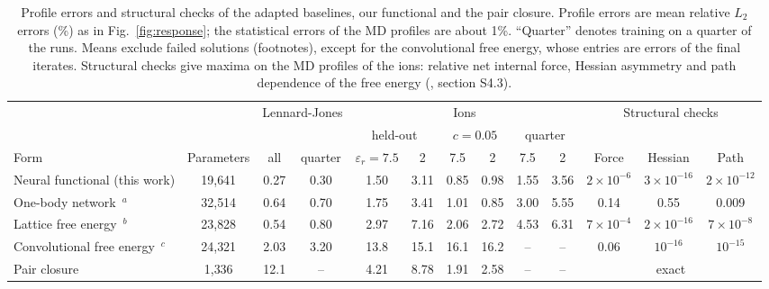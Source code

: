 \begin{table}[tb]
\centering
\caption{Profile errors and structural checks of the adapted baselines, our functional and the pair closure. Profile errors are mean relative $L_2$ errors (\%) as in Fig.~\ref{fig:response}; the statistical errors of the MD profiles are about 1\%. ``Quarter'' denotes training on a quarter of the runs. Means exclude failed solutions (footnotes), except for the convolutional free energy, whose entries are errors of the final iterates. Structural checks give maxima on the MD profiles of the ions: relative net internal force, Hessian asymmetry and path dependence of the free energy (\siref, section S4.3).}
\label{tab:compare}
\small
\setlength{\tabcolsep}{3pt}\begin{tabular}{lcccccccccccc}
 & & \multicolumn{2}{c}{Lennard-Jones} & \multicolumn{6}{c}{Ions} & \multicolumn{3}{c}{Structural checks}\\
\cmidrule(lr){3-4}\cmidrule(lr){5-10}\cmidrule(lr){11-13}
 & & & & \multicolumn{2}{c}{held-out} & \multicolumn{2}{c}{$c=0.05$} & \multicolumn{2}{c}{quarter} & & & \\
\cmidrule(lr){5-6}\cmidrule(lr){7-8}\cmidrule(lr){9-10}
Form & Parameters & all & quarter & $\varepsilon_r=7.5$ & 2 & 7.5 & 2 & 7.5 & 2 & Force & Hessian & Path\\
\midrule
Neural functional (this work) & 19{,}641 & 0.27 & 0.30 & 1.50 & 3.11 & 0.85 & 0.98 & 1.55 & 3.56 & $2\times10^{-6}$ & $3\times10^{-16}$ & $2\times10^{-12}$\\
One-body network~\cite{sammuller2023neural,bui2025learning}$^{a}$ & 32{,}514 & 0.64 & 0.70 & 1.75 & 3.41 & 1.01 & 0.85 & 3.00 & 5.55 & 0.14 & 0.55 & 0.009\\
Lattice free energy~\cite{cheng2026equivariant}$^{b}$ & 23{,}828 & 0.54 & 0.80 & 2.97 & 7.16 & 2.06 & 2.72 & 4.53 & 6.31 & $7\times10^{-4}$ & $2\times10^{-16}$ & $7\times10^{-8}$\\
Convolutional free energy~\cite{dijkman2025learning}$^{c}$ & 24{,}321 & 2.03 & 3.20 & 13.8 & 15.1 & 16.1 & 16.2 & -- & -- & 0.06 & $10^{-16}$ & $10^{-15}$\\
Pair closure & 1{,}336 & 12.1 & -- & 4.21 & 8.78 & 1.91 & 2.58 & -- & -- & \multicolumn{3}{c}{exact}\\
\bottomrule
\end{tabular}\par\smallskip
{}
\end{table}
